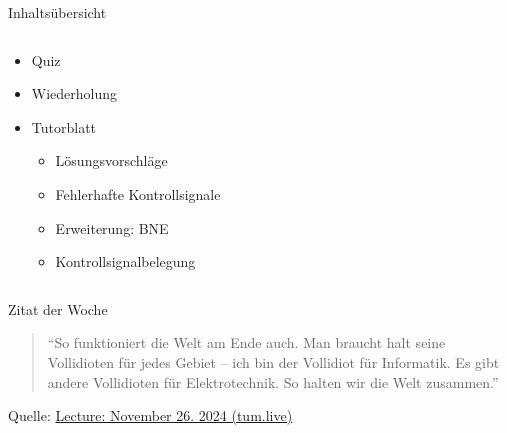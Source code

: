 \documentclass[
  german,            %
  aspectratio=169,    %
]{tumbeamer}
\begin{document}
\begin{frame}[c]{Inhaltsübersicht}{}
  \begin{columns}[c]
    \begin{column}{1\textwidth}
      \begin{itemize}
        \item Quiz
        \item Wiederholung
        \item Tutorblatt
        \begin{itemize}
          \item Lösungsvorschläge
          \item Fehlerhafte Kontrollsignale
          \item Erweiterung: BNE
          \item Kontrollsignalbelegung
        \end{itemize}
      \end{itemize}
    \end{column}
  \end{columns}
\end{frame}

\begin{frame}[c, fragile]{}{}
  \begin{center}
    \vspace{0.5cm}
    \begin{block}{Zitat der Woche}
      \vspace{0.5cm}
      \begin{quote}
        \enquote{So funktioniert die Welt am Ende auch. Man braucht halt seine Vollidioten für jedes Gebiet -- ich bin der Vollidiot für Informatik. Es gibt andere Vollidioten für Elektrotechnik. So halten wir die Welt zusammen.}
        \vspace{0.5cm}
      \end{quote}
      \vspace{0.5cm}
    \end{block}
    \vspace{0.5cm}
    Quelle: \href{https://tum.live/w/ws24EidR/50024?t=3005}{Lecture: November 26. 2024 (tum.live)}
\end{center}
\end{frame}
\end{document}
